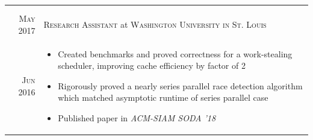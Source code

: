 \documentclass[a4paper,10pt]{article}
\begin{document}
\begin{tabular}{r|p{11cm}}
{\begin{itemize}
 \end{itemize}\vspace{-15pt}}\\\multicolumn{2}{c}{} \\
 \textsc{May 2017} & \textsc{Research Assistant} at \textsc{Washington University in St. Louis}\\
 \textsc{Jun 2016} & \small{\vspace{-10pt}\begin{itemize}
 \item Created benchmarks and proved correctness for a work-stealing scheduler, improving cache efficiency by factor of 2
 \item Rigorously proved a nearly series parallel race detection algorithm which matched asymptotic runtime of series parallel case
 \item Published paper in \textit{ACM-SIAM SODA '18}\end{itemize}\vspace{-15pt}}\\
\end{tabular}

\end{document}

